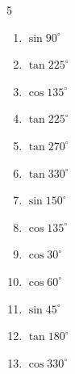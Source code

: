\begin{multicols}{5}
\begin{enumerate}
  \item $\displaystyle \sin{90^\circ}$

        \phantom{$\displaystyle =1$}

  \item $\displaystyle \tan{225^\circ}$

        \phantom{$\displaystyle =1$}

  \item $\displaystyle \cos{135^\circ}$


  \item $\displaystyle \tan{225^\circ}$

        \phantom{$\displaystyle =1$}

  \item $\displaystyle \tan{270^\circ}$

        \phantom{$\displaystyle なし$}

  \item $\displaystyle \tan{330^\circ}$


  \item $\displaystyle \sin{150^\circ}$


  \item $\displaystyle \cos{135^\circ}$


  \item $\displaystyle \cos{30^\circ}$


  \item $\displaystyle \cos{60^\circ}$


  \item $\displaystyle \sin{45^\circ}$


  \item $\displaystyle \tan{180^\circ}$

        \phantom{$\displaystyle =0$}

  \item $\displaystyle \cos{330^\circ}$


\end{enumerate}
\end{multicols}
